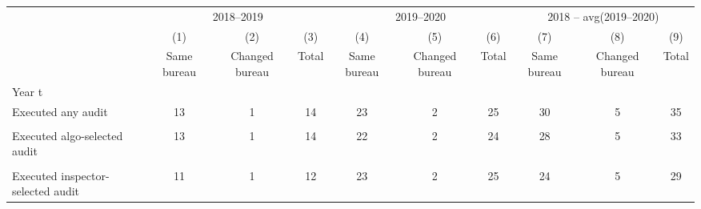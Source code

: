 {
\def\sym#1{\ifmmode^{#1}\else\(^{#1}\)\fi}
\begin{tabular}{l*{9}{c}}
\toprule
            &\multicolumn{3}{c}{2018–2019}                                    &\multicolumn{3}{c}{2019–2020}                                    &\multicolumn{3}{c}{2018 – avg(2019–2020)}                        \\\cmidrule(lr){2-4}\cmidrule(lr){5-7}\cmidrule(lr){8-10}
            &\multicolumn{1}{c}{(1)}&\multicolumn{1}{c}{(2)}&\multicolumn{1}{c}{(3)}&\multicolumn{1}{c}{(4)}&\multicolumn{1}{c}{(5)}&\multicolumn{1}{c}{(6)}&\multicolumn{1}{c}{(7)}&\multicolumn{1}{c}{(8)}&\multicolumn{1}{c}{(9)}\\
            &\multicolumn{1}{c}{Same bureau}&\multicolumn{1}{c}{Changed bureau}&\multicolumn{1}{c}{Total}&\multicolumn{1}{c}{Same bureau}&\multicolumn{1}{c}{Changed bureau}&\multicolumn{1}{c}{Total}&\multicolumn{1}{c}{Same bureau}&\multicolumn{1}{c}{Changed bureau}&\multicolumn{1}{c}{Total}\\
\midrule
Year t      &                     &                     &                     &                     &                     &                     &                     &                     &                     \\
Executed any audit&          13         &           1         &          14         &          23         &           2         &          25         &          30         &           5         &          35         \\
            &                     &                     &                     &                     &                     &                     &                     &                     &                     \\
Executed algo-selected audit&          13         &           1         &          14         &          22         &           2         &          24         &          28         &           5         &          33         \\
            &                     &                     &                     &                     &                     &                     &                     &                     &                     \\
Executed inspector-selected audit&          11         &           1         &          12         &          23         &           2         &          25         &          24         &           5         &          29         \\

\end{tabular}}
